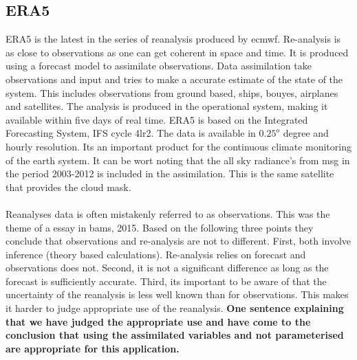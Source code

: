 \subsection{ERA5} \label{sec:era5}
ERA5 is the latest in the series of reanalysis produced by \acrfull{ecmwf}. Re-analysis is as close to observations as one can get coherent in space and time. It is produced using a forecast model to assimilate observations. Data assimilation take observations and input and tries to make a accurate estimate of the state of the system. This includes observations from ground based, ships, bouyes, airplanes and satellites. The analysis is produced in the operational system, making it available within five days of real time. ERA5 is based on the Integrated Forecasting System, IFS cycle 4lr2. The data is available in $0.25^o$ degree and hourly resolution. Its an important product for the continuous climate monitoring of the earth system. It can be wort noting that the all sky radiance's from \acrfull{msg} in the period 2003-2012 is included in the assimilation. This is the same satellite that provides the cloud mask. 
\\ \\ 
Reanalyses data is often mistakenly referred to as observations. This was the theme of a essay in \acrfull{bams}, 2015. Based on the following three points they conclude that observations and re-analysis are not to different. First, both involve inference (theory based calculations). Re-analysis relies on forecast and observations does not. Second, it is not a significant difference as long as the forecast is sufficiently accurate. Third, its important to be aware of that the uncertainty of the reanalysis is less well known than for observations. This makes it harder to judge appropriate use of the reanalysis. 
\textbf{One sentence explaining that we have judged the appropriate use and have come to the conclusion that using the assimilated variables and not parameterised are appropriate for this application.}
\\ \\
